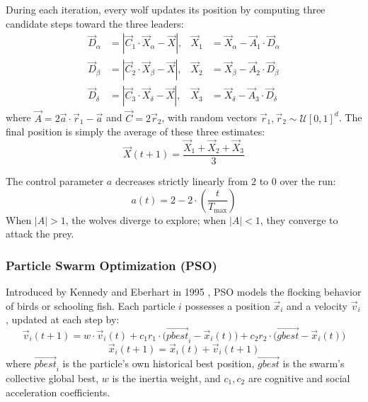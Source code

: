 During each iteration, every wolf updates its position by computing three candidate steps toward the three leaders:
\begin{align}
    \vec{D}_\alpha &= |\vec{C}_1 \cdot \vec{X}_\alpha - \vec{X}|, & \vec{X}_1 &= \vec{X}_\alpha - \vec{A}_1 \cdot \vec{D}_\alpha \\
    \vec{D}_\beta  &= |\vec{C}_2 \cdot \vec{X}_\beta - \vec{X}|,  & \vec{X}_2 &= \vec{X}_\beta - \vec{A}_2 \cdot \vec{D}_\beta \\
    \vec{D}_\delta &= |\vec{C}_3 \cdot \vec{X}_\delta - \vec{X}|, & \vec{X}_3 &= \vec{X}_\delta - \vec{A}_3 \cdot \vec{D}_\delta
\end{align}
where $\vec{A} = 2\vec{a} \cdot \vec{r}_1 - \vec{a}$ and $\vec{C} = 2\vec{r}_2$, with random vectors $\vec{r}_1, \vec{r}_2 \sim \mathcal{U}[0, 1]^d$. The final position is simply the average of these three estimates:
\begin{equation}
    \vec{X}(t+1) = \frac{\vec{X}_1 + \vec{X}_2 + \vec{X}_3}{3}
\end{equation}

The control parameter $a$ decreases strictly linearly from $2$ to $0$ over the run:
\begin{equation}
    a(t) = 2 - 2 \cdot \left(\frac{t}{T_{\max}}\right)
\end{equation}
When $|A| > 1$, the wolves diverge to explore; when $|A| < 1$, they converge to attack the prey.

\subsubsection{Particle Swarm Optimization (PSO)}
Introduced by Kennedy and Eberhart in 1995 \cite{kennedy1995particle}, PSO models the flocking behavior of birds or schooling fish. Each particle $i$ possesses a position $\vec{x}_i$ and a velocity $\vec{v}_i$, updated at each step by:
\begin{equation}
    \vec{v}_i(t+1) = w \cdot \vec{v}_i(t) + c_1 r_1 \cdot \Big(\vec{pbest}_i - \vec{x}_i(t)\Big) + c_2 r_2 \cdot \Big(\vec{gbest} - \vec{x}_i(t)\Big)
\end{equation}
\begin{equation}
    \vec{x}_i(t+1) = \vec{x}_i(t) + \vec{v}_i(t+1)
\end{equation}
where $\vec{pbest}_i$ is the particle's own historical best position, $\vec{gbest}$ is the swarm's collective global best, $w$ is the inertia weight, and $c_1, c_2$ are cognitive and social acceleration coefficients.

